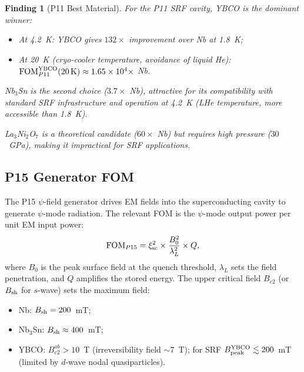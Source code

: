 \documentclass[11pt]{article}
\newtheorem{finding}{Finding}
\newcommand{\ee}[1]{\times 10^{#1}}
\begin{document}
\begin{finding}[P11 Best Material]
\label{finding:FOM-P11}
For the P11 SRF cavity, YBCO is the dominant winner:
\begin{itemize}
  \item At 4.2~K: YBCO gives $132\times$ improvement over Nb at 1.8~K;
  \item At 20~K (cryo-cooler temperature, avoidance of liquid He):
        $\text{FOM}_{P11}^{\rm YBCO}(20\,\text{K}) \approx 1.65\ee{4} \times$ Nb.
\end{itemize}
Nb$_3$Sn is the second choice ($3.7\times$ Nb), attractive for its
compatibility with standard SRF infrastructure and operation at 4.2~K
(LHe temperature, more accessible than 1.8~K).

La$_3$Ni$_2$O$_7$ is a theoretical candidate ($60\times$ Nb) but requires
high pressure ($30$~GPa), making it impractical for SRF applications.
\end{finding}

\subsection{P15 Generator FOM}

The P15 $\psi$-field generator drives EM fields into the superconducting
cavity to generate $\psi$-mode radiation. The relevant FOM is the
$\psi$-mode output power per unit EM input power:
\begin{equation}
\text{FOM}_{P15} = \xi_{\rm sc}^2 \times \frac{B_0^2}{\lambda_L^2} \times Q,
\label{eq:FOM-P15}
\end{equation}
where $B_0$ is the peak surface field at the quench threshold, $\lambda_L$
sets the field penetration, and $Q$ amplifies the stored energy.
The upper critical field $B_{c2}$ (or $B_{\rm sh}$ for $s$-wave)
sets the maximum field:
\begin{itemize}
  \item Nb: $B_{\rm sh} = 200$~mT;
  \item Nb$_3$Sn: $B_{\rm sh} \approx 400$~mT;
  \item YBCO: $B_{c2}^{ab} > 10$~T (irreversibility field $\sim 7$~T);
        for SRF $B_{\rm peak}^{\rm YBCO} \lesssim 200$~mT (limited by
        $d$-wave nodal quasiparticles).
\end{itemize}
\end{document}
